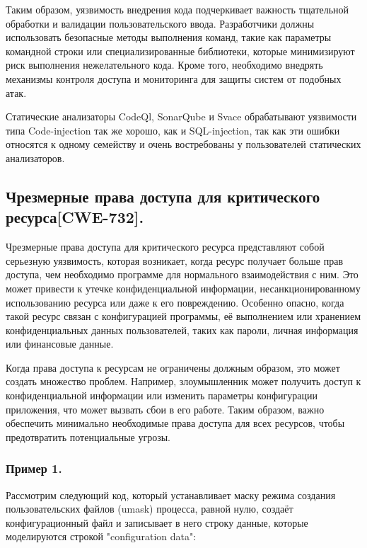 \documentclass[a4paper,12pt]{article} %
\begin{document}
			\par Таким образом, уязвимость внедрения кода подчеркивает важность тщательной обработки и валидации пользовательского ввода. Разработчики должны использовать безопасные методы выполнения команд, такие как параметры командной строки или специализированные библиотеки, которые минимизируют риск выполнения нежелательного кода. Кроме того, необходимо внедрять механизмы контроля доступа и мониторинга для защиты систем от подобных атак.

			\par Статические анализаторы CodeQl, SonarQube и Svace обрабатывают уязвимости типа Code-injection так же хорошо, как и SQL-injection, так как эти ошибки относятся к одному семейству и очень востребованы у пользователей статических анализаторов.

		\subsection{Чрезмерные права доступа для критического ресурса[CWE-732].}
			Чрезмерные права доступа для критического ресурса представляют собой серьезную уязвимость, которая возникает, когда ресурс получает больше прав доступа, чем необходимо программе для нормального взаимодействия с ним. Это может привести к утечке конфиденциальной информации, несанкционированному использованию ресурса или даже к его повреждению. Особенно опасно, когда такой ресурс связан с конфигурацией программы, её выполнением или хранением конфиденциальных данных пользователей, таких как пароли, личная информация или финансовые данные.

			\par Когда права доступа к ресурсам не ограничены должным образом, это может создать множество проблем. Например, злоумышленник может получить доступ к конфиденциальной информации или изменить параметры конфигурации приложения, что может вызвать сбои в его работе. Таким образом, важно обеспечить минимально необходимые права доступа для всех ресурсов, чтобы предотвратить потенциальные угрозы.

			\subsubsection{Пример 1.}\label{example-1}
				Рассмотрим следующий код, который устанавливает маску режима создания пользовательских файлов (umask) процесса, равной нулю, создаёт конфигурационный файл и записывает в него строку данные, которые моделируются строкой "configuration data":
\end{document}
